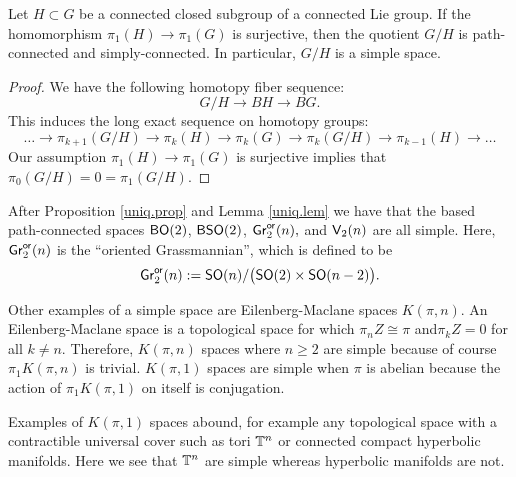 \begin{lemma} \label{uniq.lem}
Let $H \subset G$ be a connected closed subgroup of a connected Lie group.
If the homomorphism $\pi_1(H) \rightarrow \pi_1(G)$ is surjective, then the quotient $G/H$ is path-connected and simply-connected. In particular, $G/H$ is a simple space.
\end{lemma}
\begin{proof}
We have the following homotopy fiber sequence:
\[
G/H \longrightarrow BH \longrightarrow BG.
\]
This induces the long exact sequence on homotopy groups:
\[
\hdots \longrightarrow \pi_{k+1}(G/H) \longrightarrow \pi_k(H) \longrightarrow \pi_k(G) \longrightarrow \pi_k(G/H) \longrightarrow \pi_{k-1}(H) \longrightarrow \hdots
\]
Our assumption $\pi_1(H) \rightarrow \pi_1(G)$ is surjective implies that 
$\pi_0(G/H) = 0 = \pi_1(G/H)$.
\end{proof}

After Proposition \ref{uniq.prop} and Lemma \ref{uniq.lem} we have that the based path-connected spaces ${\sf BO}(2)$, ${\sf BSO}(2)$, $\operatorname{\sf Gr}^{\sf or}_2(n),$ and $\mathsf V_2(n)$ are all simple. 
Here, $\operatorname{\sf Gr}^{\sf or}_2(n)$ is the ``oriented Grassmannian'', which is defined to be
\[
\operatorname{\sf Gr}^{\sf or}_2(n) := {\sf SO}(n)/\big({\sf SO}(2) \times {\sf SO}(n-2)\big).
\]


Other examples of a simple space are Eilenberg-Maclane spaces $K(\pi, n).$ An Eilenberg-Maclane space is a topological space for which $\pi_{n}Z \cong \pi$ and$\pi_{k}Z = 0$ for all $k \neq n.$ Therefore, $K(\pi, n)$ spaces where $n \geq 2$ are simple because of course $\pi_{1}K(\pi, n)$ is trivial. $K(\pi, 1)$ spaces are simple when $\pi$ is abelian because the action of $\pi_{1}K(\pi, 1)$ on itself is conjugation.


Examples of $K(\pi, 1)$ spaces abound, for example any topological space with a contractible universal cover such as tori $\mathbb T^{n}$ or connected compact hyperbolic manifolds. Here we see that $\mathbb T^{n}$ are simple whereas hyperbolic manifolds are not.















